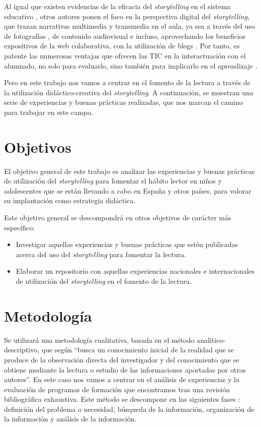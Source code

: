 \documentclass[spanish]{textolivre}
\begin{document}
Al igual que existen evidencias de la eficacia del \textit{storytelling} en el sistema educativo \cite{bautista-garcia-vera_audiovisual_2009}, otros autores \cite{robin_digital_2008,lambert_digital_2013} ponen el foco en la perspectiva digital del \textit{storytelling}, que trazan narrativas multimedia y transmedia en el aula, ya sea a través del uso de fotografías \cite{sadik_digital_2008}, de contenido audiovisual \cite{ohler_world_2006} e incluso, aprovechando los beneficios expositivos de la web colaborativa, con la utilización de blogs \cite{abdel-hack_using_2014}. Por tanto, es patente las numerosas ventajas que ofrecen las TIC en la interactuación con el alumnado, no solo para evaluarlo, sino también para implicarlo en el aprendizaje \cite{dreon_digital_2011}.

Pero en este trabajo nos vamos a centrar en el fomento de la lectura a través de la utilización didáctico-creativa del \textit{storytelling}. A continuación, se muestran una serie de experiencias y buenas prácticas realizadas, que nos marcan el camino para trabajar en este campo.


\section{Objetivos}\label{sec-modelo}
El objetivo general de este trabajo es analizar las experiencias y buenas prácticas de utilización del \textit{storytelling} para fomentar el hábito lector en niños y adolescentes que se están llevando a cabo en España y otros países, para valorar su implantación como estrategia didáctica.

Este objetivo general se descompondrá en otros objetivos de carácter más específico:

\begin{itemize}
 \item Investigar aquellas experiencias y buenas prácticas que estén publicadas acerca del uso del \textit{storytelling} para fomentar la lectura.
 \item Elaborar un repositorio con aquellas experiencias nacionales e internacionales de utilización del \textit{storytelling} en el fomento de la lectura. 
\end{itemize}

\section{Metodología}\label{sec-organizacao}
Se utilizará una metodología cualitativa, basada en el método analítico-descriptivo, que según \textcite[p. 198]{abreu_metodo_2014} “busca un conocimiento inicial de la realidad que se produce de la observación directa del investigador y del conocimiento que se obtiene mediante la lectura o estudio de las informaciones aportadas por otros autores”. En este caso nos vamos a centrar en el análisis de experiencias y la evaluación de programas de formación que encontramos tras una revisión bibliográfica exhaustiva. Este método se descompone en las siguientes fases \cite{gomez-luna_metodologipara_2014}: definición del problema o necesidad, búsqueda de la información, organización de la información y análisis de la información.
\end{document}
